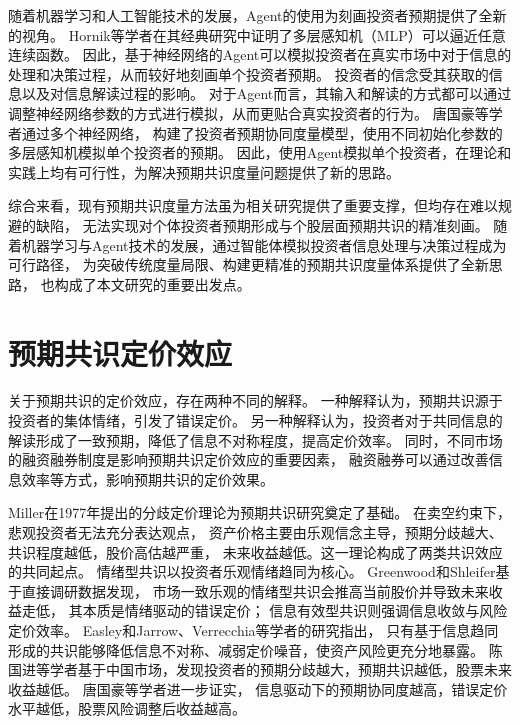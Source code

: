 随着机器学习和人工智能技术的发展，Agent的使用为刻画投资者预期提供了全新的视角。
Hornik等学者在其经典研究中证明了多层感知机（MLP）可以逼近任意连续函数\cite{hornik1989multilayer}。
因此，基于神经网络的Agent可以模拟投资者在真实市场中对于信息的处理和决策过程，从而较好地刻画单个投资者预期。
投资者的信念受其获取的信息\cite{sims2003implications}以及对信息解读\cite{daniel1998investor}\cite{hong2007disagreement}过程的影响。
对于Agent而言，其输入和解读的方式都可以通过调整神经网络参数的方式进行模拟，从而更贴合真实投资者的行为。
唐国豪等学者\cite{唐国豪2025投资者预期协同}通过多个神经网络，
构建了投资者预期协同度量模型，使用不同初始化参数的多层感知机模拟单个投资者的预期。
因此，使用Agent模拟单个投资者，在理论和实践上均有可行性，为解决预期共识度量问题提供了新的思路。

综合来看，现有预期共识度量方法虽为相关研究提供了重要支撑，但均存在难以规避的缺陷，
无法实现对个体投资者预期形成与个股层面预期共识的精准刻画。
随着机器学习与Agent技术的发展，通过智能体模拟投资者信息处理与决策过程成为可行路径，
为突破传统度量局限、构建更精准的预期共识度量体系提供了全新思路，
也构成了本文研究的重要出发点。

\section{预期共识定价效应}

关于预期共识的定价效应，存在两种不同的解释。
一种解释认为，预期共识源于投资者的集体情绪，引发了错误定价。
另一种解释认为，投资者对于共同信息的解读形成了一致预期，降低了信息不对称程度，提高定价效率。
同时，不同市场的融资融券制度是影响预期共识定价效应的重要因素，
融资融券可以通过改善信息效率等方式，影响预期共识的定价效果。

Miller在1977年提出的分歧定价理论为预期共识研究奠定了基础。
在卖空约束下，悲观投资者无法充分表达观点，
资产价格主要由乐观信念主导，预期分歧越大、共识程度越低，股价高估越严重，
未来收益越低。这一理论构成了两类共识效应的共同起点\cite{miller1977risk}。
情绪型共识以投资者乐观情绪趋同为核心。
Greenwood和Shleifer基于直接调研数据发现，
市场一致乐观的情绪型共识会推高当前股价并导致未来收益走低，
其本质是情绪驱动的错误定价\cite{greenwood2014expectations}；
信息有效型共识则强调信息收敛与风险定价效率。
Easley和Jarrow\cite{easley1983consensus}、Verrecchia\cite{verrecchia2001essays}等学者的研究指出，
只有基于信息趋同形成的共识能够降低信息不对称、减弱定价噪音，使资产风险更充分地暴露。
陈国进等学者基于中国市场，发现投资者的预期分歧越大，预期共识越低，股票未来收益越低\cite{陈国进2008异质信念与盈余惯性}。
唐国豪等学者进一步证实，
信息驱动下的预期协同度越高，错误定价水平越低，股票风险调整后收益越高\cite{唐国豪2025投资者预期协同}。

